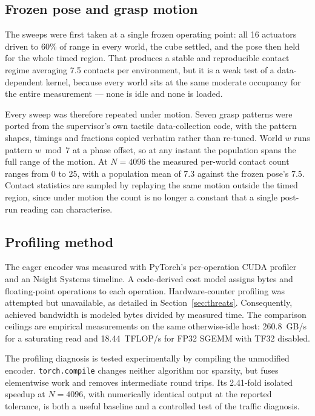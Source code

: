 \documentclass[journal]{IEEEtran}
\begin{document}
\subsection{Frozen pose and grasp motion}
\label{sec:motion}

The sweeps were first taken at a single frozen operating point: all 16 actuators driven to 60\% of range in every world, the cube settled, and the pose then held for the whole timed region. That produces a stable and reproducible contact regime averaging 7.5 contacts per environment, but it is a weak test of a data-dependent kernel, because every world sits at the same moderate occupancy for the entire measurement --- none is idle and none is loaded.

Every sweep was therefore repeated under motion. Seven grasp patterns were ported from the supervisor's own tactile data-collection code, with the pattern shapes, timings and fractions copied verbatim rather than re-tuned. World $w$ runs pattern $w \bmod 7$ at a phase offset, so at any instant the population spans the full range of the motion. At $N=4096$ the measured per-world contact count ranges from 0 to 25, with a population mean of 7.3 against the frozen pose's 7.5. Contact statistics are sampled by replaying the same motion outside the timed region, since under motion the count is no longer a constant that a single post-run reading can characterise.

\subsection{Profiling method}

The eager encoder was measured with PyTorch's per-operation CUDA profiler and an Nsight Systems timeline. A code-derived cost model assigns bytes and floating-point operations to each operation. Hardware-counter profiling was attempted but unavailable, as detailed in Section~\ref{sec:threats}. Consequently, achieved bandwidth is modeled bytes divided by measured time. The comparison ceilings are empirical measurements on the same otherwise-idle host: 260.8~GB/s for a saturating read and 18.44~TFLOP/s for FP32 SGEMM with TF32 disabled.

The profiling diagnosis is tested experimentally by compiling the unmodified encoder. \texttt{torch.compile} changes neither algorithm nor sparsity, but fuses elementwise work and removes intermediate round trips. Its 2.41-fold isolated speedup at $N=4096$, with numerically identical output at the reported tolerance, is both a useful baseline and a controlled test of the traffic diagnosis.
\end{document}
